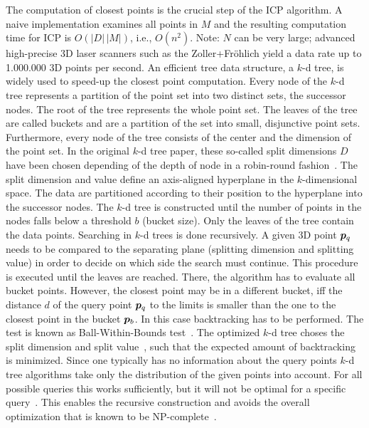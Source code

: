 \documentclass[twocolumn,oneside]{book}
\newcommand{\V}[1]{\vector{#1}}  %
\begin{document}
The computation of closest points is the crucial step of the ICP
algorithm. A naive implementation examines all points in $M$ and the
resulting computation time for ICP is $O(|D|\,|M|)$, i.e.,
$O(n^2)$. Note: $N$ can be very large; advanced high-precise 3D laser
scanners such as the Zoller+Fr\"ohlich yield a data rate up to
1.000.000 3D points per second. An efficient tree data structure, a
$k$-d tree, is widely used to speed-up the closest point
computation. Every node of the $k$-d tree represents a partition of
the point set into two distinct sets, the successor nodes. The root of
the tree represents the whole point set. The leaves of the tree are
called buckets and are a partition of the set into small, disjunctive
point sets. Furthermore, every node of the tree consists of the center
and the dimension of the point set.  In the original $k$-d tree paper,
these so-called split dimensions $D$ have been chosen depending of the
depth of node in a robin-round fashion~\cite{Bentley_1975}.  The split
dimension and value define an axis-aligned hyperplane in the
$k$-dimensional space. The data are partitioned according to their
position to the hyperplane into the successor nodes. The $k$-d tree is
constructed until the number of points in the nodes falls below a
threshold $b$ (bucket size). Only the leaves of the tree contain the
data points. Searching in $k$-d trees is done recursively. A given 3D
point $\V p_q$ needs to be compared to the separating plane (splitting
dimension and splitting value) in order to decide on which side the
search must continue. This procedure is executed until the leaves are
reached. There, the algorithm has to evaluate all bucket
points. However, the closest point may be in a different bucket, iff
the distance $d$ of the query point $\V p_q$ to the limits is smaller
than the one to the closest point in the bucket $\V p_b$.  In this
case backtracking has to be performed. The test is known as
Ball-Within-Bounds test~\cite{Bentley_1975, Friedman_1977,
  Greenspan_2003}. The optimized $k$-d tree choses the split dimension
and split value~\cite{Friedman_1977}, such that the expected amount of
backtracking is minimized.  Since one typically has no information
about the query points $k$-d tree algorithms take only the
distribution of the given points into account. For all possible
queries this works sufficiently, but it will not be optimal for a
specific query~\cite{Friedman_1977}. This enables the recursive
construction and avoids the overall optimization that is known to be
NP-complete~\cite{Hyafil_1977}.
\end{document}

